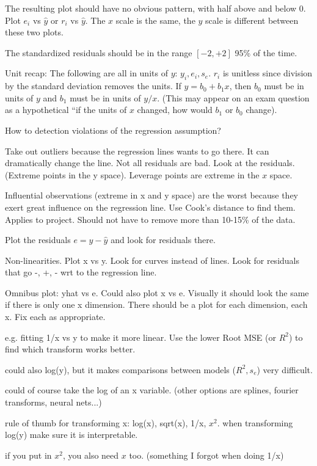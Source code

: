 \documentclass[11pt, oneside]{article}   	%
\begin{document}
The resulting plot should have no obvious pattern, with half above and below 0. Plot $e_i$ vs $\hat{y}$ or $r_i$ vs $\hat{y}$. The $x$ scale is the same, the $y$ scale is different between these two plots.

The standardized residuals should be in the range $[-2, +2]$ 95\% of the time.

Unit recap: The following are all in units of $y$: $y_i, e_i, s_e$. $r_i$ is unitless since division by the standard deviation removes the units. If $y = b_0 + b_1 x$, then $b_0$ must be in units of $y$ and $b_1$ must be in units of $y/x$. (This may appear on an exam question as a hypothetical ``if the units of $x$ changed, how would $b_1$ or $b_0$ change).

How to detection violations of the regression assumption?

Take out outliers because the regression lines wants to go there. It can dramatically change the line. Not all residuals are bad. Look at the residuals. (Extreme points in the y space). Leverage points are extreme in the $x$ space.

Influential observations (extreme in x and y space) are the worst because they exert great influence on the regression line. Use Cook's distance to find them. Applies to project. Should not have to remove more than 10-15\% of the data.

Plot the residuals $e = y - \hat{y}$ and look for residuals there.

Non-linearities. Plot x vs y. Look for curves instead of lines.  Look for residuals that go -, +, - wrt to the regression line.

Omnibus plot: yhat vs e. Could also plot x vs e. Visually it should look the same if there is only one x dimension. There should be a plot for each dimension, each x. Fix each as appropriate.

e.g. fitting 1/x vs y to make it more linear. Use the lower Root MSE (or $R^2$) to find which transform works better.

could also log(y), but it makes comparisons between models ($R^2, s_e$) very difficult. 

could of course take the log of an x variable. (other options are splines, fourier transforms, neural nets...)

rule of thumb for transforming x: log(x), sqrt(x), 1/x, $x^2$. when transforming log(y) make sure it is interpretable.

if you put in $x^2$, you also need $x$ too. (something I forgot when doing 1/x)
\end{document}
